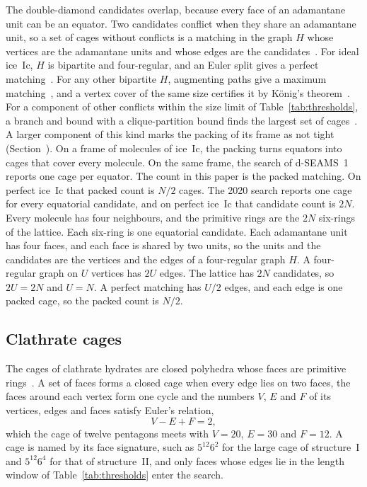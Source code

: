 \documentclass[preprint,12pt]{elsarticle}
\begin{document}
The double-diamond candidates overlap, because every face of an adamantane unit can be an equator.
Two candidates conflict when they share an adamantane unit, so a set of cages without conflicts is a matching in the graph $H$ whose vertices are the adamantane units and whose edges are the candidates~\cite{schrijver2003combinatorial}.
For ideal ice~Ic, $H$ is bipartite and four-regular, and an Euler split gives a perfect matching~\cite{gabow1976euler}.
For any other bipartite $H$, augmenting paths give a maximum matching~\cite{kuhn1955hungarian}, and a vertex cover of the same size certifies it by K\"onig's theorem~\cite{konig1931graphs}.
For a component of other conflicts within the size limit of Table~\ref{tab:thresholds}, a branch and bound with a clique-partition bound finds the largest set of cages~\cite{tomita2003maxclique}.
A larger component of this kind marks the packing of its frame as not tight (Section~).
On a frame of  molecules of ice~Ic, the packing turns  equators into  cages that cover every molecule.
On the same frame, the search of d-SEAMS~1 reports one cage per equator.
The count in this paper is the packed matching.
On perfect ice~Ic that packed count is $N/2$ cages.
The 2020 search reports one cage for every equatorial candidate, and on perfect ice~Ic that candidate count is $2N$.
Every molecule has four neighbours, and the primitive rings are the $2N$ six-rings of the lattice.
Each six-ring is one equatorial candidate.
Each adamantane unit has four faces, and each face is shared by two units, so the units and the candidates are the vertices and the edges of a four-regular graph $H$.
A four-regular graph on $U$ vertices has $2U$ edges.
The lattice has $2N$ candidates, so $2U=2N$ and $U=N$.
A perfect matching has $U/2$ edges, and each edge is one packed cage, so the packed count is $N/2$.

\subsection{Clathrate cages}
\label{sec:clathrates}

The cages of clathrate hydrates are closed polyhedra whose faces are primitive rings~\cite{jacobson2010amorphous,matsumoto2007topological}.
A set of faces forms a closed cage when every edge lies on two faces, the faces around each vertex form one cycle and the numbers $V$, $E$ and $F$ of its vertices, edges and faces satisfy Euler's relation,
\begin{equation}
  V-E+F=2,
  \label{eq:euler}
\end{equation}
which the cage of twelve pentagons meets with $V=20$, $E=30$ and $F=12$.
A cage is named by its face signature, such as $5^{12}6^{2}$ for the large cage of structure~I and $5^{12}6^{4}$ for that of structure~II, and only faces whose edges lie in the length window of Table~\ref{tab:thresholds} enter the search.
\end{document}
